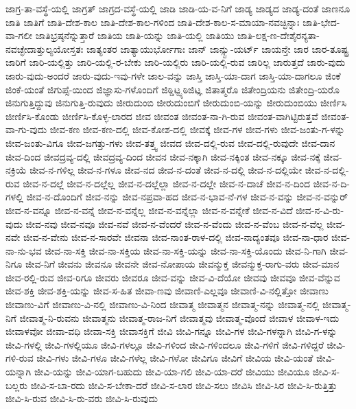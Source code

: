 {ಜಾಗ್ರ-ತಾ-ವಸ್ಥೆ-ಯಲ್ಲಿ
ಜಾಗ್ರತ್
ಜಾಗ್ರದ-ವಸ್ಥೆ-ಯಲ್ಲಿ
ಜಾಡಿ
ಜಾಡಿ-ಯ-ವ-ನಿಗೆ
ಜಾಡ್ಯ
ಜಾಡ್ಯದ
ಜಾಡ್ಯ-ದಂತೆ
ಜಾಣನೂ
ಜಾತಿ
ಜಾತಿಗೆ
ಜಾತಿ-ದೇಶ-ಕಾಲ
ಜಾತಿ-ದೇಶ-ಕಾಲ-ಗಳಿಂದ
ಜಾತಿ-ದೇಶ-ಕಾಲ-ಸ-ಮಾಯಾ-ನವಚ್ಛಿನ್ನಾಃ
ಜಾತಿ-ಭೇದ-ವಾ-ಗಲೀ
ಜಾತಿಭ್ರಷ್ಠನೆನ್ನುತ್ತಾರೆ
ಜಾತಿಯ
ಜಾತಿ-ಯನ್ನು
ಜಾತಿ-ಯಲ್ಲಿ
ಜಾತಿಯು
ಜಾತಿ-ಲಕ್ಷ-ಣ-ದೇಶೈರನ್ಯತಾ-ನವಚ್ಛೇದಾತ್ತುಲ್ಯಯೋಸ್ತತಃ
ಜಾತ್ಯಂತರ
ಜಾತ್ಯಾಯುರ್ಭೋಗಾಃ
ಜಾನ್
ಜಾನ್ಸ್ಟು-ಯರ್ಟ್
ಜಾಯನ್ತೇ
ಜಾರ
ಜಾರ-ತೂಷ್ಟ್ರ
ಜಾರಿಗೆ
ಜಾರಿ-ಯಲ್ಲಿತ್ತು
ಜಾರಿ-ಯಲ್ಲಿ-ರ-ಬೇಕು
ಜಾರಿ-ಯಲ್ಲಿರು
ಜಾರಿ-ಯಲ್ಲಿ-ರುವ
ಜಾರಿಲ್ಲ
ಜಾರುತ್ತದೆ
ಜಾರು-ವುದು
ಜಾರು-ವುದು-ಅಂದರೆ
ಜಾರು-ವುದು-ಇವು-ಗಳೇ
ಜಾಲ-ವನ್ನು
ಜಾಸ್ತಿ
ಜಾಸ್ತಿ-ಯಾ-ದಾಗ
ಜಾಸ್ತಿ-ಯಾ-ದಾಗಲೂ
ಜಿಂಕೆ
ಜಿಂಕೆ-ಯಂತೆ
ಜಿಗುಪ್ಸೆ-ಯಿಂದ
ಜಿಜ್ಞಾಸು-ಗಳೊಂದಿಗೆ
ಜಿಠ್ಡಿಟ್ಝ್ಠಠಿಜಿಟ್ಞ
ಜಿತಾತ್ಮರೊ
ಜಿತೇಂದ್ರಿಯನು
ಜಿತೇಂದ್ರಿ-ಯರೊ
ಜಿನುಗುತ್ತಿದ್ದುವು
ಜಿನುಗುತ್ತಿ-ರುವುದು
ಜೀರುದುಂಬಿ
ಜೀರುದುಂಬಿಗೆ
ಜೀರುದುಂಬಿ-ಯನ್ನು
ಜೀರುದುಂಬಿಯು
ಜೀರ್ಣಿಸಿ
ಜೀರ್ಣಿಸಿ-ಕೊಂಡು
ಜೀರ್ಣಿಸಿ-ಕೊಳ್ಳ-ಲಾರದ
ಜೀವ
ಜೀವಂತ
ಜೀವಂತ-ನಾ-ಗಿ-ರುವ
ಜೀವಂತ-ವಾಗಿಟ್ಟಿರುತ್ತವೆ
ಜೀವಂತ-ವಾ-ಗು-ವುದು
ಜೀವ-ಕಣ
ಜೀವ-ಕಣ-ದಲ್ಲಿ
ಜೀವ-ಕೋಶ-ದಲ್ಲಿ
ಜೀವಕ್ಕೆ
ಜೀವ-ಗಳ
ಜೀವ-ಗಳು
ಜೀವ-ಜಂತು-ಗ-ಳನ್ನು
ಜೀವ-ಜಂತು-ವಿಗೂ
ಜೀವ-ಜಗತ್ತು-ಗಳು
ಜೀವ-ತತ್ತ್ವ
ಜೀವದ
ಜೀವ-ದಲ್ಲಿ-ರುವ
ಜೀವ-ದಲ್ಲಿ-ರುವುದೇ
ಜೀವ-ದಾನ
ಜೀವ-ದಿಂದ
ಜೀವದ್ರವ್ಯ-ದಲ್ಲಿ
ಜೀವದ್ರವ್ಯ-ದಿಂದ
ಜೀವನ
ಜೀವ-ನಕ್ಕಾಗಿ
ಜೀವ-ನಕ್ಕಿಂತ
ಜೀವ-ನಕ್ಕೂ
ಜೀವ-ನಕ್ಕೆ
ಜೀವ-ನಕ್ರಿಯೆ
ಜೀವ-ನ-ಗಳಿಲ್ಲ
ಜೀವ-ನ-ಗಳೂ
ಜೀವ-ನದ
ಜೀವ-ನ-ದಂತೆ
ಜೀವ-ನ-ದಲ್ಲಿ
ಜೀವ-ನ-ದಲ್ಲಿಯೇ
ಜೀವ-ನ-ದಲ್ಲಿ-ರುವ
ಜೀವ-ನ-ದಲ್ಲೆ
ಜೀವ-ನ-ದಲ್ಲೆಲ್ಲ
ಜೀವ-ನ-ದಲ್ಲೆಲ್ಲಾ
ಜೀವ-ನ-ದಲ್ಲೇ
ಜೀವ-ನ-ದಾಚೆ
ಜೀವ-ನ-ದಿಂದ
ಜೀವ-ನ-ದಿ-ಗಳಲ್ಲಿ
ಜೀವ-ನ-ದೊಂದಿಗೆ
ಜೀವ-ನನ್ನು
ಜೀವ-ನಪ್ರವಾ-ಹದ
ಜೀವ-ನ-ಭಾವ-ನೆ-ಗಳ
ಜೀವ-ನ-ವನ್ನು
ಜೀವ-ನ-ವನ್ನುರ್
ಜೀವ-ನ-ವನ್ನೂ
ಜೀವ-ನ-ವನ್ನೆ
ಜೀವ-ನ-ವನ್ನೆಲ್ಲ
ಜೀವ-ನ-ವನ್ನೆಲ್ಲಾ
ಜೀವ-ನ-ವನ್ನೇಕೆ
ಜೀವ-ನ-ವಿದೆ
ಜೀವ-ನ-ವಿ-ರು-ವುದು
ಜೀವ-ನವು
ಜೀವ-ನವೂ
ಜೀವ-ನವೆ
ಜೀವ-ನ-ವೆಂದರೆ
ಜೀವ-ನ-ವೆಂದು
ಜೀವ-ನ-ವೆಂಬ
ಜೀವ-ನ-ವೆಲ್ಲ
ಜೀವ-ನವೇ
ಜೀವ-ನ-ವೇನು
ಜೀವ-ನ-ಸಾರವೇ
ಜೀವನಾ
ಜೀವ-ನಾಂತ-ರಾಳ-ದಲ್ಲಿ
ಜೀವ-ನಾದ್ಯಂತವೂ
ಜೀವ-ನಾ-ಧಾರ
ಜೀವ-ನಾ-ನು-ಭವ
ಜೀವ-ನಾ-ಸಕ್ತಿ
ಜೀವ-ನಾ-ಸಕ್ತಿಯ
ಜೀವ-ನಾ-ಸಕ್ತಿ-ಯನ್ನು
ಜೀವ-ನಾ-ಸಕ್ತಿ-ಯೊಂದು
ಜೀವ-ನಿ-ಗಾಗಿ
ಜೀವ-ನಿಗೂ
ಜೀವ-ನಿಗೆ
ಜೀವನು
ಜೀವನೂ
ಜೀವನೇ
ಜೀವ-ನೋಪಾಯ
ಜೀವನ್ಮುಕ್ತ
ಜೀವನ್ಮುಕ್ತ-ರಾಗು-ವರು
ಜೀವ-ಮಾನ
ಜೀವ-ರಲ್ಲಿ-ರುವ
ಜೀವ-ರಿಗೂ
ಜೀವರು
ಜೀವರೂ
ಜೀವ-ವನ್ನು
ಜೀವ-ವಿ-ದೆಯೋ
ಜೀವವು
ಜೀವವೂ
ಜೀವ-ವೆನ್ನುವ
ಜೀವ-ಶಕ್ತಿ
ಜೀವ-ಶಕ್ತಿ-ಯನ್ನು
ಜೀವ-ಸ-ಹಿತ
ಜೀವಾ-ಣವು
ಜೀವಾಣಿ-ಎಲ್ಲವೂ
ಜೀವಾಣಿ-ವಿ-ನಲ್ಲಿತ್ತೋ
ಜೀವಾಣು
ಜೀವಾಣು-ವಿಗೆ
ಜೀವಾಣು-ವಿ-ನಲ್ಲಿ
ಜೀವಾಣು-ವಿ-ನಿಂದ
ಜೀವಾತ್ಮ
ಜೀವಾತ್ಮನ
ಜೀವಾತ್ಮ-ನನ್ನು
ಜೀವಾತ್ಮ-ನಲ್ಲಿ
ಜೀವಾತ್ಮ-ನಿಗೆ
ಜೀವಾತ್ಮ-ನಿ-ರುವನು
ಜೀವಾತ್ಮನು
ಜೀವಾತ್ಮ-ರಾಜ-ನಿಗೆ
ಜೀವಾತ್ಮವು
ಜೀವಾತ್ಮ-ವೊಂದೆ
ಜೀವಾಳ
ಜೀವಾಳ-ಇದು
ಜೀವಾಳವೋ
ಜೀವಾ-ವಧಿ
ಜೀವಾ-ಸಕ್ತಿ
ಜೀವಾಸಕ್ತಿಗೆ
ಜೀವಿ
ಜೀವಿ-ಗನ್ನೂ
ಜೀವಿ-ಗಳ
ಜೀವಿ-ಗಳನ್ನಾಗಿ
ಜೀವಿ-ಗ-ಳನ್ನು
ಜೀವಿ-ಗಳಲ್ಲಿ
ಜೀವಿ-ಗಳಲ್ಲಿಯೂ
ಜೀವಿ-ಗಳಲ್ಲೂ
ಜೀವಿ-ಗಳಿಂದ
ಜೀವಿ-ಗಳಿಂದಲೂ
ಜೀವಿ-ಗಳಿಗೆ
ಜೀವಿ-ಗಳಿದ್ದರೆ
ಜೀವಿ-ಗಳಿ-ರುವ
ಜೀವಿ-ಗಳು
ಜೀವಿ-ಗಳೂ
ಜೀವಿ-ಗಳೆಲ್ಲ
ಜೀವಿ-ಗಳೋ
ಜೀವಿಗೂ
ಜೀವಿಗೆ
ಜೀವಿಯ
ಜೀವಿ-ಯಂತೆ
ಜೀವಿ-ಯನ್ನಾಗಿ
ಜೀವಿ-ಯನ್ನು
ಜೀವಿ-ಯಾಗ-ಬಹುದು
ಜೀವಿ-ಯಾ-ಗಲಿ
ಜೀವಿ-ಯಾ-ದರೆ
ಜೀವಿಯು
ಜೀವಿಯೂ
ಜೀವಿ-ಸ-ಬಲ್ಲರು
ಜೀವಿ-ಸ-ಬಾ-ರದು
ಜೀವಿ-ಸ-ಬೇಕಾ-ದರೆ
ಜೀವಿ-ಸ-ಲಾರ
ಜೀವಿ-ಸಲು
ಜೀವಿಸಿ
ಜೀವಿ-ಸಿರ
ಜೀವಿ-ಸಿ-ರುತ್ತಿತ್ತು
ಜೀವಿ-ಸಿ-ರುವ
ಜೀವಿ-ಸಿ-ರು-ವರು
ಜೀವಿ-ಸಿ-ರುವುದು
}
